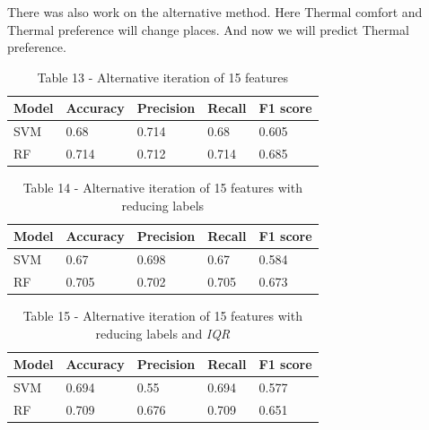 There was also work on the alternative method. Here Thermal comfort and
Thermal preference will change places. And now we will predict Thermal
preference.

\begin{table}[H]
\caption*{Table 13 - Alternative iteration of 15 features}
\centering
\begin{tabular}{|l|l|l|l|l|}
\hline
Model & Accuracy & Precision & Recall & F1 score \\ \hline
SVM   & 0.68     & 0.714     & 0.68   & 0.605    \\ \hline
RF    & 0.714    & 0.712     & 0.714  & 0.685    \\ \hline
\end{tabular}
\end{table}

\begin{table}[H]
\caption*{Table 14 - Alternative iteration of 15 features with reducing labels}
\centering
\begin{tabular}{|l|l|l|l|l|}
\hline
Model & Accuracy & Precision & Recall & F1 score \\ \hline
SVM   & 0.67     & 0.698     & 0.67   & 0.584    \\ \hline
RF    & 0.705    & 0.702     & 0.705  & 0.673    \\ \hline
\end{tabular}
\end{table}

\begin{table}[H]
\caption*{Table 15 - Alternative iteration of 15 features with reducing labels and \emph{IQR}}
\centering
\begin{tabular}{|l|l|l|l|l|}
\hline
Model & Accuracy & Precision & Recall & F1 score \\ \hline
SVM   & 0.694    & 0.55      & 0.694  & 0.577    \\ \hline
RF    & 0.709    & 0.676     & 0.709  & 0.651    \\ \hline
\end{tabular}
\end{table}

